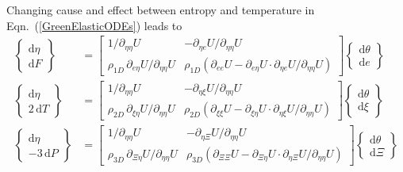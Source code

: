 Changing cause and effect between entropy and temperature in Eqn.~(\ref{GreenElasticODEs}) leads to
\begin{subequations}
    \label{HelmholtzElasticODEs}
    \begin{align}
    \left\{ \begin{matrix} \mathrm{d} \eta \\ 
    \mathrm{d} F \end{matrix} \right\} & = \begin{bmatrix}
    1/\partial_{\eta\eta} U & -\partial_{\eta e} U / 
    \partial_{\eta\eta} U \\
    \rho_{1D} \, \partial_{e\eta} U / \partial_{\eta\eta} U & \rho_{1D} ( \partial_{ee} U - \partial_{e\eta} U \!\cdot\! \partial_{\eta e} U / \partial_{\eta\eta} U ) \end{bmatrix} 
    \left\{ \begin{matrix} \mathrm{d} \theta \\
    \mathrm{d} e \end{matrix} \right\} \\
    \left\{ \begin{matrix} \mathrm{d} \eta \\ 
    2 \, \mathrm{d} T \end{matrix} \right\} & = \begin{bmatrix}
    1/\partial_{\eta\eta} U & -\partial_{\eta \xi} U / \partial_{\eta\eta} U \\
    \rho_{2D} \, \partial_{\xi\eta} U / \partial_{\eta\eta} U & \rho_{2D} ( \partial_{\xi\xi} U - \partial_{\xi\eta} U \!\cdot\! \partial_{\eta\xi} U / \partial_{\eta\eta} U ) \end{bmatrix} \left\{ \begin{matrix} \mathrm{d} \theta \\
    \mathrm{d} \xi \end{matrix} \right\} \label{HelmholtzMembrane} \\
    \left\{ \begin{matrix} \mathrm{d} \eta \\ 
    -3 \, \mathrm{d} P \end{matrix} \right\} & = \begin{bmatrix}
    1/\partial_{\eta\eta} U & -\partial_{\eta \Xi} U / \partial_{\eta\eta} U \\
    \rho_{3D} \, \partial_{\Xi\eta} U / \partial_{\eta\eta} U & \rho_{3D} ( \partial_{\Xi\Xi} U - \partial_{\Xi\eta} U \!\cdot\! \partial_{\eta\Xi} U / \partial_{\eta\eta} U ) \end{bmatrix} \left\{ \begin{matrix} \mathrm{d} \theta \\
    \mathrm{d} \Xi \end{matrix} \right\}
    \end{align}
\end{subequations}
